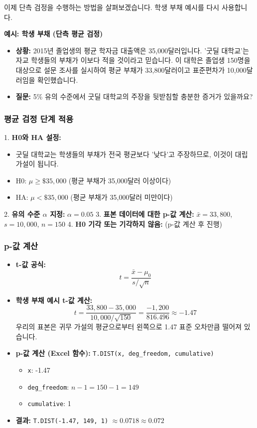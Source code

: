 \documentclass[11pt,a4paper]{article}
\theoremstyle{definition}
\begin{document}
이제 단측 검정을 수행하는 방법을 살펴보겠습니다. 학생 부채 예시를 다시 사용합니다.

\begin{examplebox}
\textbf{예시: 학생 부채 (단측 평균 검정)}
\begin{itemize}
    \item \textbf{상황:} 2015년 졸업생의 평균 학자금 대출액은 35,000달러입니다. '굿딜 대학교'는 자교 학생들의 부채가 이보다 적을 것이라고 믿습니다. 이 대학은 졸업생 150명을 대상으로 설문 조사를 실시하여 평균 부채가 33,800달러이고 표준편차가 10,000달러임을 확인했습니다.
    \item \textbf{질문:} 5\% 유의 수준에서 굿딜 대학교의 주장을 뒷받침할 충분한 증거가 있을까요?
\end{itemize}
\end{examplebox}

\subsubsection*{평균 검정 단계 적용}

1.  \textbf{H0와 HA 설정:}
    \begin{itemize}
        \item 굿딜 대학교는 학생들의 부채가 전국 평균보다 '낮다'고 주장하므로, 이것이 대립 가설이 됩니다.
        \item H0: $\mu \ge \$35,000$ (평균 부채가 35,000달러 이상이다)
        \item HA: $\mu < \$35,000$ (평균 부채가 35,000달러 미만이다)
    \end{itemize}
2.  \textbf{유의 수준 $\alpha$ 지정:} $\alpha = 0.05$
3.  \textbf{표본 데이터에 대한 p-값 계산:} $\bar{x} = 33,800$, $s = 10,000$, $n = 150$
4.  \textbf{H0 기각 또는 기각하지 않음:} (p-값 계산 후 진행)

\subsubsection*{p-값 계산}

\begin{itemize}
    \item \textbf{t-값 공식:}
    \[ t = \frac{\bar{x} - \mu_0}{s / \sqrt{n}} \]
    \item \textbf{학생 부채 예시 t-값 계산:}
    \[ t = \frac{33,800 - 35,000}{10,000 / \sqrt{150}} = \frac{-1,200}{816.496} \approx -1.47 \]
    우리의 표본은 귀무 가설의 평균으로부터 왼쪽으로 1.47 표준 오차만큼 떨어져 있습니다.
    \item \textbf{p-값 계산 (Excel 함수):} \texttt{T.DIST(x, deg_freedom, cumulative)}
        \begin{itemize}
            \item \texttt{x}: -1.47
            \item \texttt{deg_freedom}: $n-1 = 150-1 = 149$
            \item \texttt{cumulative}: 1
        \end{itemize}
    \item \textbf{결과:} \texttt{T.DIST(-1.47, 149, 1)} $\approx 0.0718 \approx 0.072$
\end{itemize}
\end{document}

